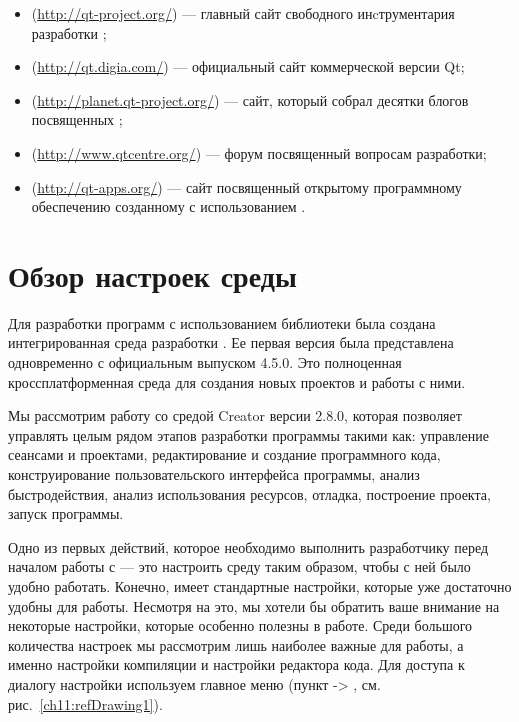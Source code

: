 \begin{itemize}
\item {} ({\small\url{http://qt-project.org/}}) --- главный сайт свободного инcтрументария разработки
;
\item {} ({\small\url{http://qt.digia.com/}}) --- официальный сайт коммерческой версии Qt;
\item {} ({\small\url{http://planet.qt-project.org/}}) --- сайт, который собрал десятки блогов посвященных
;
\item {} ({\small\url{http://www.qtcentre.org/}}) --- форум посвященный
вопросам разработки;
\item {} ({\small\url{http://qt-apps.org/}}) --- сайт посвященный
открытому программному обеспечению созданному с использованием .
\end{itemize}

\section[Обзор настроек среды \Sys{Qt Creator}]{Обзор настроек среды }
Для разработки программ с использованием библиотеки  была создана интегрированная среда разработки
. Ее первая версия была представлена
одновременно с официальным выпуском  4.5.0. Это полноценная кроссплатформенная
среда для создания новых проектов и работы с ними.

Мы рассмотрим работу со средой  Creator версии 2.8.0, которая позволяет управлять целым рядом этапов
разработки программы такими как: управление сеансами и проектами, редактирование и создание программного кода,
конструирование пользовательского интерфейса программы, анализ быстродействия, анализ использования ресурсов, отладка,
построение проекта, запуск программы.

Одно из первых действий, которое необходимо выполнить разработчику перед началом работы с  --- это
настроить среду таким образом, чтобы с ней было удобно работать. Конечно, 
имеет стандартные настройки, которые уже достаточно удобны для работы. Несмотря на это, мы хотели бы обратить ваше
внимание на некоторые настройки, которые особенно полезны в работе. Среди большого количества настроек мы рассмотрим
лишь наиболее важные для работы, а именно настройки компиляции и настройки редактора кода. Для доступа к диалогу
настройки используем главное меню (пункт -> , см. рис.~\ref{ch11:refDrawing1}).

